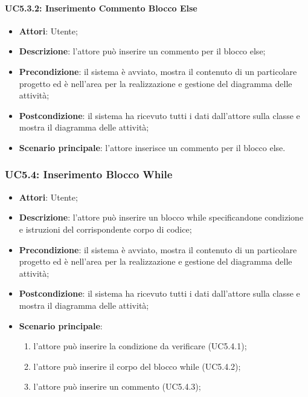 \paragraph{UC5.3.2: Inserimento Commento Blocco Else}
\label{UC5.3.2}
\begin{itemize}
	\item \textbf{Attori}: Utente;
	\item \textbf{Descrizione}: l'attore può inserire un commento per il blocco else;
	\item \textbf{Precondizione}: il sistema è avviato, mostra il contenuto di un particolare progetto ed è nell'area per la realizzazione e gestione del diagramma delle attività;
	\item \textbf{Postcondizione}: il sistema ha ricevuto tutti i dati dall'attore sulla classe e mostra il diagramma delle attività;
	\item \textbf{Scenario principale}: l'attore inserisce un commento per il blocco else.
\end{itemize}

\subsubsection{UC5.4: Inserimento Blocco While}
\label{UC5.4}
\begin{itemize}
	\item \textbf{Attori}: Utente;
	\item \textbf{Descrizione}: l'attore può inserire un blocco while specificandone condizione e istruzioni del corrispondente corpo di codice;
	\item \textbf{Precondizione}: il sistema è avviato, mostra il contenuto di un particolare progetto ed è nell'area per la realizzazione e gestione del diagramma delle attività;
	\item \textbf{Postcondizione}: il sistema ha ricevuto tutti i dati dall'attore sulla classe e mostra il diagramma delle attività;
	\item \textbf{Scenario principale}:
	\begin{enumerate}
		\item l'attore può inserire la condizione da verificare (UC5.4.1);
		\item l'attore può inserire il corpo del blocco while (UC5.4.2);
		\item l'attore può inserire un commento (UC5.4.3);
	\end{enumerate}
\end{itemize}

